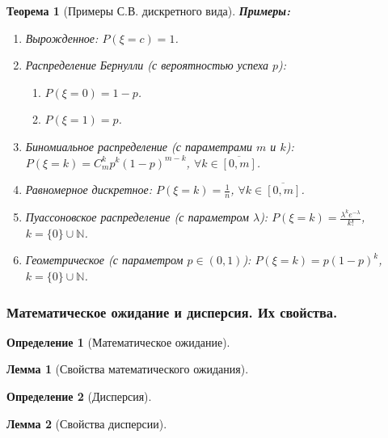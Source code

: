 \documentclass[14pt]{extarticle}
\theoremstyle{breakstyle}
\newtheorem{definition}{Определение}[subsection]
\newtheorem{theorem}{Теорема}[subsection]
\newtheorem{lemma}{Лемма}[subsection]
\begin{document}
\begin{theorem}[Примеры С.В. дискретного вида]

\textbf{Примеры:}
\begin{enumerate}
    \item Вырожденное: $P(\xi = c) = 1$.

    \item Распределение Бернулли (с вероятностью успеха $p$):
          \begin{enumerate}
              \item $P(\xi = 0) = 1 - p$.
              \item $P(\xi = 1) = p$.
          \end{enumerate}

    \item Биномиальное распределение (с параметрами $m$ и $k$): $P(\xi = k) = C_{m}^{k}p^{k}(1-p)^{m - k}$, $\forall k \in \overline{[0, m]}$.
    \item Равномерное дискретное: $P(\xi = k) = \frac{1}{n}$, $\forall k \in \overline{[0, m]}$.
    \item Пуассоновское распределение (с параметром $\lambda$): $P(\xi = k) = \frac{\lambda^{k}e^{-\lambda}}{k!}$, $k = \{0\} \cup \mathbb{N}$.
    \item Геометрическое (с параметром $p \in (0, 1)$): $P(\xi = k) = p (1-p)^{k}$, $k = \{0\} \cup \mathbb{N}$.
          
\end{enumerate}

\end{theorem}

\subsubsection{Математическое ожидание и дисперсия. Их свойства.}
\begin{definition}[Математическое ожидание]

\end{definition}

\begin{lemma}[Свойства математического ожидания]

\end{lemma}

\begin{definition}[Дисперсия]

\end{definition}

\begin{lemma}[Свойства дисперсии]

\end{lemma}
\end{document}
